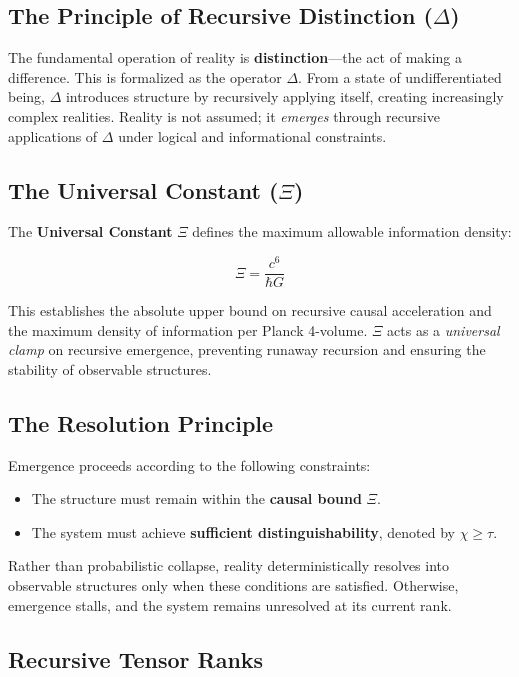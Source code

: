 \documentclass[12pt,a4paper]{article}
\begin{document}
\subsection{The Principle of Recursive Distinction (\(\Delta\))}

The fundamental operation of reality is \textbf{distinction}—the act of making a difference. This is formalized as the operator \(\Delta\). From a state of undifferentiated being, \(\Delta\) introduces structure by recursively applying itself, creating increasingly complex realities. Reality is not assumed; it \textit{emerges} through recursive applications of \(\Delta\) under logical and informational constraints.

\subsection{The Universal Constant (\(\Xi\))}

The \textbf{Universal Constant} \(\Xi\) defines the maximum allowable information density:

\[
\Xi = \frac{c^6}{\hbar G}
\]

This establishes the absolute upper bound on recursive causal acceleration and the maximum density of information per Planck 4-volume. \(\Xi\) acts as a \textit{universal clamp} on recursive emergence, preventing runaway recursion and ensuring the stability of observable structures.

\subsection{The Resolution Principle}

Emergence proceeds according to the following constraints:

\begin{itemize}
    \item The structure must remain within the \textbf{causal bound} \(\Xi\).
    \item The system must achieve \textbf{sufficient distinguishability}, denoted by \(\chi \geq \tau\).
\end{itemize}

Rather than probabilistic collapse, reality deterministically resolves into observable structures only when these conditions are satisfied. Otherwise, emergence stalls, and the system remains unresolved at its current rank.

\subsection{Recursive Tensor Ranks}
\end{document}
